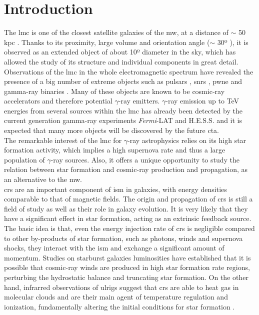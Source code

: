 \documentclass[main.tex]{subfiles}
\begin{document}
\glsresetall

\section{Introduction}

The \gls{lmc} is one of the closest satellite galaxies of the \gls{mw}, at a distance of $\sim$ 50 kpc \cite{2013LMCdistance1}. Thanks to its proximity, large volume and orientation angle ($\sim$ 30º \cite{2004StructureandOrientationLMC}), it is observed as an extended object of about 10º diameter in the sky, which has allowed the study of its structure and individual components in great detail. Observations of the \gls{lmc} in the whole electromagnetic spectrum have revealed the presence of a big number of extreme objects such as pulsars \cite{2013RadioPulsarsLMC} \cite{2016LMCFermiLAT}, \glspl{snr} \cite{2015MultiwavelengthLMCsnr} \cite{2012XMM1987} \cite{2016SNRinXrayLMC},  \gls{pwne} \cite{2015HESSTeVLMC} \cite{2016LMCFermiLAT} \cite{2003PWNeintheLMC} \cite{2008PWNeXrayLMC} and gamma-ray binaries \cite{2017HESSLMCP3}. Many of these objects are known to be cosmic-ray accelerators and therefore potential $\gamma$-ray emitters. $\gamma$-ray emission up to TeV energies from several sources within the \gls{lmc} has already been detected by the current generation gamma-ray experiments \textit{Fermi}-LAT and H.E.S.S. and it is expected that many more objects will be discovered by the future \gls{cta}.\\
The remarkable interest of the \gls{lmc} for $\gamma$-ray astrophysics relies on its high star formation activity, which implies a high supernova rate and thus a large population of $\gamma$-ray sources. Also, it offers a unique opportunity to study the relation between star formation and cosmic-ray production and propagation, as an alternative to the \gls{mw}.\\
\glspl{cr} are an important component of \gls{ism} in galaxies, with energy densities comparable to that of magnetic fields. The origin and propagation of \glspl{cr} is still a field of study as well as their role in galaxy evolution. It is very likely that they have a significant effect in star formation, acting as an extrinsic feedback source. The basic idea is that, even the energy injection rate of \glspl{cr} is negligible compared to other by-products of star formation, such as photons, winds and supernova shocks, they interact with the \gls{ism} and exchange a significant amount of momentum. Studies on starburst galaxies luminosities \cite{2008SocratesCRandSF} have established that it is possible that cosmic-ray winds are produced in high star formation rate regions, perturbing the hydrostatic balance and truncating star formation. On the other hand, infrarred observations of \gls{ulrigs} suggest that \glspl{cr} are able to heat gas in molecular clouds and are their main agent of temperature regulation and ionization, fundamentally altering the initial conditions for star formation \cite{2010PapadopoulosCRinSF}.\\
\end{document}
